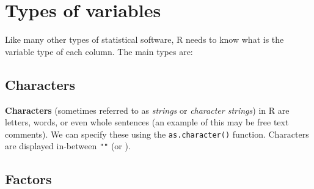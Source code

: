 \documentclass[]{book}
\makeatletter
\newenvironment{Shaded}{\begin{snugshade}}{\end{snugshade}}
\newcommand{\KeywordTok}[1]{\textcolor[rgb]{0.13,0.29,0.53}{\textbf{#1}}}
\newcommand{\DecValTok}[1]{\textcolor[rgb]{0.00,0.00,0.81}{#1}}
\newcommand{\StringTok}[1]{\textcolor[rgb]{0.31,0.60,0.02}{#1}}
\newcommand{\CommentTok}[1]{\textcolor[rgb]{0.56,0.35,0.01}{\textit{#1}}}
\newcommand{\OperatorTok}[1]{\textcolor[rgb]{0.81,0.36,0.00}{\textbf{#1}}}
\newcommand{\NormalTok}[1]{#1}
\newenvironment{kframe}{%
\medskip{}
\setlength{\fboxsep}{.8em}
 \def\at@end@of@kframe{}%
 \ifinner\ifhmode%
  \def\at@end@of@kframe{\end{minipage}}%
  \begin{minipage}{\columnwidth}%
 \fi\fi%
 \def\FrameCommand##1{\hskip\@totalleftmargin \hskip-\fboxsep
 \colorbox{shadecolor}{##1}\hskip-\fboxsep
     \hskip-\linewidth \hskip-\@totalleftmargin \hskip\columnwidth}%
 \MakeFramed {\advance\hsize-\width
   \@totalleftmargin\z@ \linewidth\hsize
   \@setminipage}}%
 {\par\unskip\endMakeFramed%
 \at@end@of@kframe}
\renewenvironment{Shaded}{\begin{kframe}}{\end{kframe}}
\makeatother
\begin{document}
\begin{Shaded}
\end{Shaded}

\section{Types of variables}\label{types-of-variables}

Like many other types of statistical software, R needs to know what is
the variable type of each column. The main types are:

\subsection{Characters}\label{characters}

\textbf{Characters} (sometimes referred to as \emph{strings} or
\emph{character strings}) in R are letters, words, or even whole
sentences (an example of this may be free text comments). We can specify
these using the \texttt{as.character()} function. Characters are
displayed in-between \texttt{""} (or
\texttt{\textquotesingle{}\textquotesingle{}}).

\subsection{Factors}\label{factors}
\end{document}

